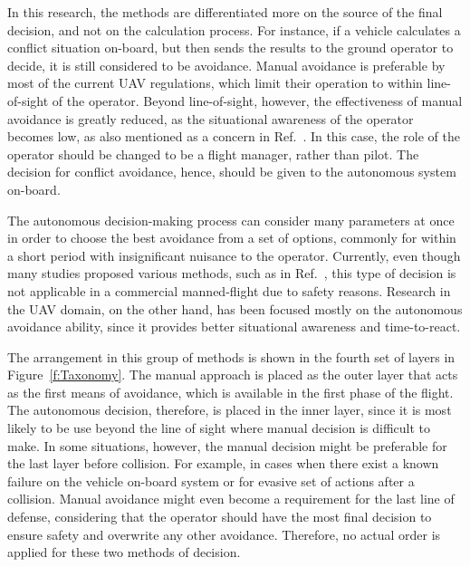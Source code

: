 In this research, the methods are differentiated more on the source of the final decision, and not on the calculation process. For instance, if a vehicle calculates a conflict situation on-board, but then sends the results to the ground operator to decide, it is still considered to be  avoidance. Manual avoidance is preferable by most of the current UAV regulations, which limit their operation to within line-of-sight of the operator\cite{CAP722}. Beyond line-of-sight, however, the effectiveness of manual avoidance is greatly reduced, as the situational awareness of the operator becomes low, as also mentioned as a concern in Ref.~\cite{LeTallec:05}. In this case, the role of the operator should be changed to be a flight manager, rather than pilot. The decision for conflict avoidance, hence, should be given to the autonomous system on-board.

The autonomous decision-making process can consider many parameters at once in order to choose the best avoidance from a set of options, commonly for within a short period with insignificant nuisance to the operator. Currently, even though many studies proposed various methods, such as in Ref.~\cite{Huang:14}, this type of decision is not applicable in a commercial manned-flight due to safety reasons. Research in the UAV domain, on the other hand, has been focused mostly on the autonomous avoidance ability, since it provides better situational awareness and time-to-react. 

The arrangement in this group of methods is shown in the fourth set of layers in Figure~\ref{f:Taxonomy}. The manual approach is placed as the outer layer that acts as the first means of avoidance, which is available in the first phase of the flight. The autonomous decision, therefore, is placed in the inner layer, since it is most likely to be use beyond the line of sight where manual decision is difficult to make. In some situations, however, the manual decision might be preferable for the last layer before collision. For example, in cases when there exist a known failure on the vehicle on-board system or for evasive set of actions after a collision. Manual avoidance might even become a requirement for the last line of defense, considering that the operator should have the most final decision to ensure safety and overwrite any other avoidance. Therefore, no actual order is applied for these two methods of decision.

